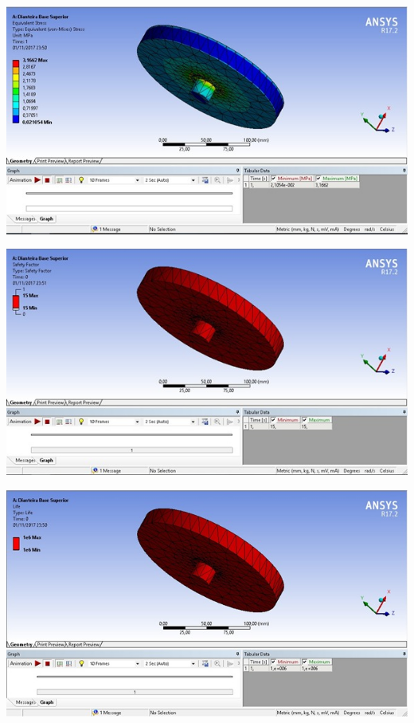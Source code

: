     
     \begin{center}
    	\includegraphics[scale=0.7]{figuras/stress_1}
        \label{stress_1}
    \end{center}
   

     \begin{center}
    	\includegraphics[scale=0.7]{figuras/fator_seguranca_1}
        \label{fator_seguranca_1}
    \end{center}
    

     \begin{center}
    	\includegraphics[scale=0.7]{figuras/vida_util_1}
        \label{vida_util_1}
    \end{center}

